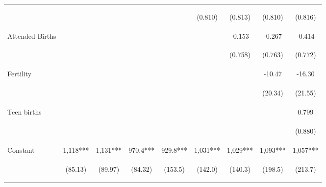 \begin{table}[htpb!]
\begin{center}
\begin{tabular}{lcccccccc}
&&&&&\begin{footnotesize}(0.810)\end{footnotesize}&\begin{footnotesize}(0.813)\end{footnotesize}&\begin{footnotesize}(0.810)\end{footnotesize}&\begin{footnotesize}(0.816)\end{footnotesize}\\
Attended Births&&&&&&-0.153&-0.267&-0.414\\
&&&&&&\begin{footnotesize}(0.758)\end{footnotesize}&\begin{footnotesize}(0.763)\end{footnotesize}&\begin{footnotesize}(0.772)\end{footnotesize}\\
Fertility&&&&&&&-10.47&-16.30\\
&&&&&&&\begin{footnotesize}(20.34)\end{footnotesize}&\begin{footnotesize}(21.55)\end{footnotesize}\\
Teen births&&&&&&&&0.799\\
&&&&&&&&\begin{footnotesize}(0.880)\end{footnotesize}\\
Constant&1,118***&1,131***&970.4***&929.8***&1,031***&1,029***&1,093***&1,057***\\
&\begin{footnotesize}(85.13)\end{footnotesize}&\begin{footnotesize}(89.97)\end{footnotesize}&\begin{footnotesize}(84.32)\end{footnotesize}&\begin{footnotesize}(153.5)\end{footnotesize}&\begin{footnotesize}(142.0)\end{footnotesize}&\begin{footnotesize}(140.3)\end{footnotesize}&\begin{footnotesize}(198.5)\end{footnotesize}&\begin{footnotesize}(213.7)\end{footnotesize}\\

\end{tabular}
\end{center}
\end{table}
